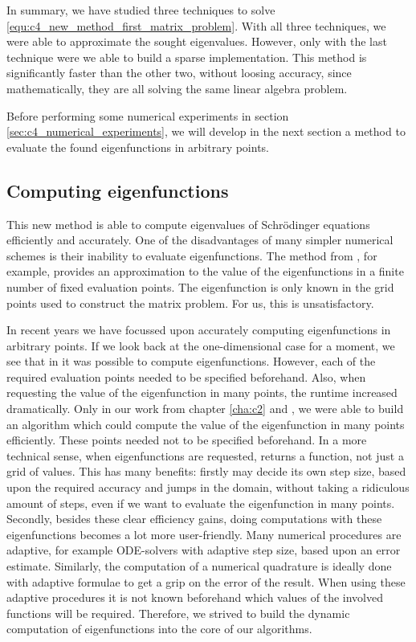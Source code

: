 In summary, we have studied three techniques to solve \eqref{equ:c4_new_method_first_matrix_problem}. With all three techniques, we were able to approximate the sought eigenvalues. However, only with the last technique were we able to build a sparse implementation. This method is significantly faster than the other two, without loosing accuracy, since mathematically, they are all solving the same linear algebra problem.

Before performing some numerical experiments in section \ref{sec:c4_numerical_experiments}, we will develop in the next section a method to evaluate the found eigenfunctions in arbitrary points.

\subsection{Computing eigenfunctions}

This new method is able to compute eigenvalues of Schrödinger equations efficiently and accurately. One of the disadvantages of many simpler numerical schemes is their inability to evaluate eigenfunctions. The method from \cite{wang_new_2009}, for example, provides an approximation to the value of the eigenfunctions in a finite number of fixed evaluation points. The eigenfunction is only known in the grid points used to construct the matrix problem. For us, this is unsatisfactory.

In recent years we have focussed upon accurately computing eigenfunctions in arbitrary points. If we look back at the one-dimensional case for a moment, we see that in  \cite{ledoux_matslise_2016} it was possible to compute eigenfunctions. However, each of the required evaluation points needed to be specified beforehand. Also, when requesting the value of the eigenfunction in many points, the runtime increased dramatically. Only in our work from chapter \ref{cha:c2} and \cite{baeyens_fast_2020}, we were able to build an algorithm which could compute the value of the eigenfunction in many points efficiently. These points needed not to be specified beforehand. In a more technical sense, when eigenfunctions are requested,  returns a function, not just a grid of values. This has many benefits: firstly  may decide its own step size, based upon the required accuracy and jumps in the domain, without taking a ridiculous amount of steps, even if we want to evaluate the eigenfunction in many points. Secondly, besides these clear efficiency gains, doing computations with these eigenfunctions becomes a lot more user-friendly. Many numerical procedures are adaptive, for example ODE-solvers with adaptive step size, based upon an error estimate. Similarly, the computation of a numerical quadrature is ideally done with adaptive formulae to get a grip on the error of the result. When using these adaptive procedures it is not known beforehand which values of the involved functions will be required. Therefore, we strived to build the dynamic computation of eigenfunctions into the core of our algorithms.

